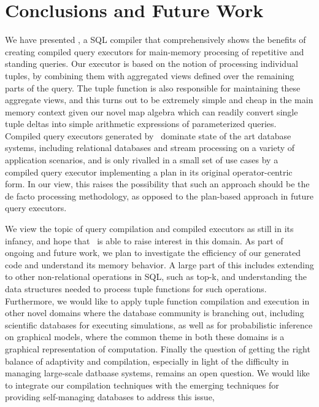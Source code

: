\section{Conclusions and Future Work}

We have presented \compiler, a SQL compiler that comprehensively shows the
benefits of creating compiled query executors for main-memory procesing of
repetitive and standing queries. Our executor is based on the notion of
processing individual tuples, by combining them with aggregated views defined
over the remaining parts of the query. The tuple function is also responsible for
maintaining these aggregate views, and this turns out to be extremely simple and
cheap in the main memory context given our novel map algebra which can readily
convert single tuple deltas into simple arithmetic expressions of parameterized
queries. Compiled query executors generated by \compiler\ dominate state of the
art database systems, including relational databases and stream processing on a
variety of application scenarios, and is only rivalled in a small set of use
cases by a compiled query executor implementing a plan in its original
operator-centric form. In our view, this raises the possibility that such an
approach should be the de facto processing methodology, as opposed to the
plan-based approach in future query executors.

We view the topic of query compilation and compiled executors as still in its
infancy, and hope that \compiler\ is able to raise interest in this domain. 
As part of ongoing and future work, we plan to investigate the efficiency of
our generated code and understand its memory behavior. A large part of this
includes extending to other non-relational operations in SQL, such as top-k,
and understanding the data structures needed to process tuple functions for
such operations. Furthermore, we would like to apply tuple function
compilation and execution in other novel domains where the database
community is branching out, including scientific databases for executing
simulations, as well as for probabilistic inference on graphical models, where
the common theme in both these domains is a graphical representation of 
computation. Finally the question of getting the right balance of adaptivity
and compilation, especially in light of the difficulty in managing large-scale
datbaase systems, remains an open question. We would like to integrate our
compilation techniques with the emerging techniques for providing self-managing
databases to address this issue,

